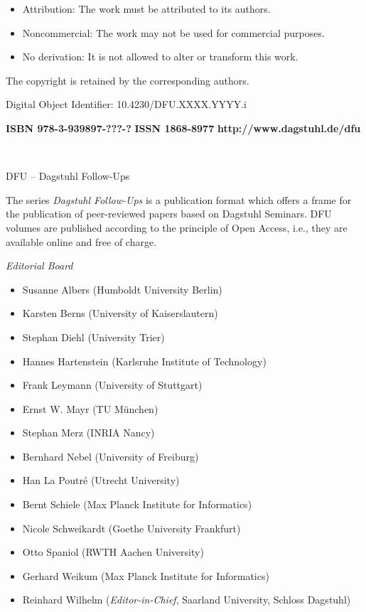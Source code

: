 \documentclass[a4paper,UKenglish]{dfumaster}
\begin{document}
\begin{publicationinfo}
\begin{itemize}
\item Attribution: The work must be attributed to its authors.
\item Noncommercial: The work may not be used for commercial purposes. 
\item No derivation: It is not allowed to alter or transform this work.
\end{itemize}

\smallskip

The copyright is retained by the corresponding authors.

\bigskip
\bigskip
\bigskip
\bigskip

Digital Object Identifier: 10.4230/DFU.XXXX.YYYY.i

\vfill
\textbf{ISBN 978-3-939897-???-?} \qquad \qquad \textbf{ISSN 1868-8977}  \hfill \textbf{http://www.dagstuhl.de/dfu}

  
 \newpage

\ \\
\bigskip
\bigskip
\bigskip

{\Large DFU -- Dagstuhl Follow-Ups}
 
 \bigskip

The series \emph{Dagstuhl Follow-Ups} is a publication format which offers a frame for the publication of peer-reviewed papers based on Dagstuhl Seminars.  
DFU volumes are published according to the principle of Open Access, i.e., they are available online and free of charge. 

 
 \bigskip
 \bigskip
 \bigskip
 
 
\emph{Editorial Board}

\begin{itemize}
\item Susanne Albers (Humboldt University Berlin)
\item Karsten Berns (University of Kaiserslautern)
\item Stephan Diehl (University Trier)
\item Hannes Hartenstein (Karlsruhe Institute of Technology)
\item Frank Leymann (University of Stuttgart)
\item Ernst W. Mayr (TU München)
\item Stephan Merz (INRIA Nancy)
\item Bernhard Nebel (University of Freiburg)
\item Han La Poutré (Utrecht University)
\item Bernt Schiele (Max Planck Institute for Informatics)
\item Nicole Schweikardt (Goethe University Frankfurt)
\item Otto Spaniol (RWTH Aachen University)
\item Gerhard Weikum (Max Planck Institute for Informatics)
\item Reinhard Wilhelm (\emph{Editor-in-Chief}, Saarland University, Schloss Dagstuhl)
 \end{itemize}



\end{publicationinfo}
\end{document}
